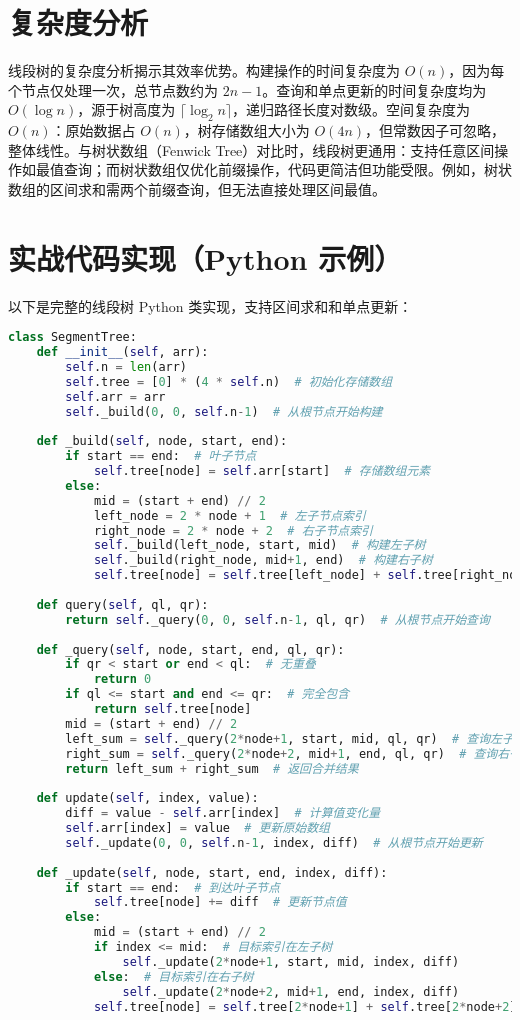 \chapter{复杂度分析}
线段树的复杂度分析揭示其效率优势。构建操作的时间复杂度为 $O(n)$，因为每个节点仅处理一次，总节点数约为 $2n - 1$。查询和单点更新的时间复杂度均为 $O(\log n)$，源于树高度为 $\lceil \log_2 n \rceil$，递归路径长度对数级。空间复杂度为 $O(n)$：原始数据占 $O(n)$，树存储数组大小为 $O(4n)$，但常数因子可忽略，整体线性。与树状数组（Fenwick Tree）对比时，线段树更通用：支持任意区间操作如最值查询；而树状数组仅优化前缀操作，代码更简洁但功能受限。例如，树状数组的区间求和需两个前缀查询，但无法直接处理区间最值。\par
\chapter{实战代码实现（Python 示例）}
以下是完整的线段树 Python 类实现，支持区间求和和单点更新：\par
\begin{lstlisting}[language=python]
class SegmentTree:
    def __init__(self, arr):
        self.n = len(arr)
        self.tree = [0] * (4 * self.n)  # 初始化存储数组
        self.arr = arr
        self._build(0, 0, self.n-1)  # 从根节点开始构建
    
    def _build(self, node, start, end):
        if start == end:  # 叶子节点
            self.tree[node] = self.arr[start]  # 存储数组元素
        else:
            mid = (start + end) // 2
            left_node = 2 * node + 1  # 左子节点索引
            right_node = 2 * node + 2  # 右子节点索引
            self._build(left_node, start, mid)  # 构建左子树
            self._build(right_node, mid+1, end)  # 构建右子树
            self.tree[node] = self.tree[left_node] + self.tree[right_node]  # 合并求和
    
    def query(self, ql, qr):
        return self._query(0, 0, self.n-1, ql, qr)  # 从根节点开始查询
    
    def _query(self, node, start, end, ql, qr):
        if qr < start or end < ql:  # 无重叠
            return 0
        if ql <= start and end <= qr:  # 完全包含
            return self.tree[node]
        mid = (start + end) // 2
        left_sum = self._query(2*node+1, start, mid, ql, qr)  # 查询左子树
        right_sum = self._query(2*node+2, mid+1, end, ql, qr)  # 查询右子树
        return left_sum + right_sum  # 返回合并结果
    
    def update(self, index, value):
        diff = value - self.arr[index]  # 计算值变化量
        self.arr[index] = value  # 更新原始数组
        self._update(0, 0, self.n-1, index, diff)  # 从根节点开始更新
    
    def _update(self, node, start, end, index, diff):
        if start == end:  # 到达叶子节点
            self.tree[node] += diff  # 更新节点值
        else:
            mid = (start + end) // 2
            if index <= mid:  # 目标索引在左子树
                self._update(2*node+1, start, mid, index, diff)
            else:  # 目标索引在右子树
                self._update(2*node+2, mid+1, end, index, diff)
            self.tree[node] = self.tree[2*node+1] + self.tree[2*node+2]  # 回溯更新父节点
\end{lstlisting}
